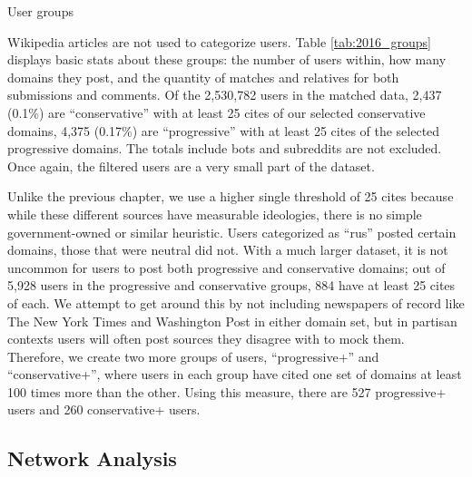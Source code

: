 \documentclass[doublespacing]{utdthesis}
\begin{document}
\begin{table}[!ht]
\centering
\caption{User groups}

\label{tab:2016_groups}
\end{table}

Wikipedia articles are not used to categorize users.
Table \ref{tab:2016_groups} displays basic stats about these groups: the number of users within, how many domains they post, and the quantity of matches and relatives for both submissions and comments.
Of the 2,530,782 users in the matched data, 2,437 (0.1\%) are ``conservative'' with at least 25 cites of our selected conservative domains, 4,375 (0.17\%)  are ``progressive'' with at least 25 cites of the selected progressive domains.
The totals include bots and subreddits are not excluded.
Once again, the filtered users are a very small part of the dataset.

Unlike the previous chapter, we use a higher single threshold of 25 cites because while these different sources have measurable ideologies, there is no simple government-owned or similar heuristic.
Users categorized as ``rus'' posted certain domains, those that were neutral did not.
With a much larger dataset, it is not uncommon for users to post both progressive and conservative domains; out of 5,928 users in the progressive and conservative groups, 884 have at least 25 cites of each.
We attempt to get around this by not including newspapers of record like The New York Times and Washington Post in either domain set, but in partisan contexts users will often post sources they disagree with to mock them.
Therefore, we create two more groups of users, ``progressive+'' and ``conservative+'', where users in each group have cited one set of domains at least 100 times more than the other.
Using this measure, there are 527 progressive+ users and 260 conservative+ users.

\subsection{Network Analysis}
\end{document}

